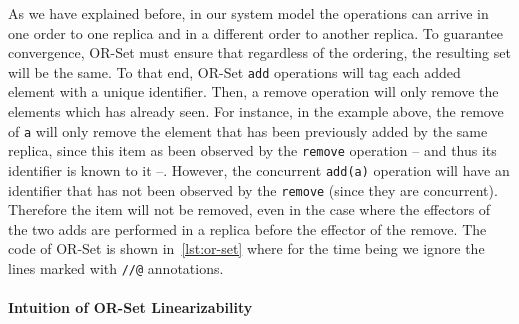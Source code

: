 As we have explained before, in our system model the operations can
arrive in one order to one replica and in a different order to another
replica.
%
To guarantee convergence, OR-Set must ensure that regardless of the
ordering, the resulting set will be the same.
%
To that end, OR-Set \lstinline|add| operations will tag each added
element with a unique identifier.
%
Then, a remove operation will only remove the elements which has
already seen.
%
For instance, in the example above, the remove of \lstinline|a| will
only remove the element that has been previously added by the same
replica, since this item as been observed by the \lstinline|remove|
operation -- and thus its identifier is known to it --. However, the
concurrent \lstinline|add(a)| operation will have an identifier that
has not been observed by the \lstinline|remove| (since they are
concurrent).
%
Therefore the item will not be removed, even in the case where the
effectors of the two adds are performed in a replica before the effector
of the remove.
%
The code of OR-Set is shown in~\autoref{lst:or-set} where for the time
being we ignore the lines marked with \lstinline|//@| annotations.


\paragraph{Intuition of OR-Set Linearizability}

